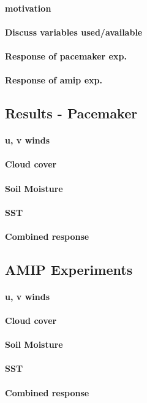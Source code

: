 \paragraph{motivation}
\paragraph{Discuss variables used/available}
\paragraph{Response of pacemaker exp.}
\paragraph{Response of amip exp.}


\subsection{Results - Pacemaker}
\paragraph{u, v winds}
\paragraph{Cloud cover}
\paragraph{Soil Moisture}
\paragraph{SST}
\paragraph{Combined response}


\subsection{AMIP Experiments}

\paragraph{u, v winds}
\paragraph{Cloud cover}
\paragraph{Soil Moisture}
\paragraph{SST}
\paragraph{Combined response}

